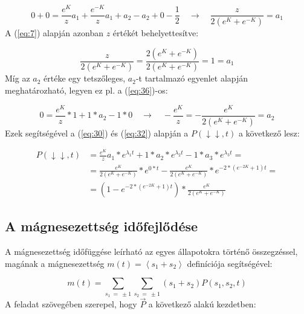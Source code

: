 \begin{equation} \label{eq:39}
    0 + 0
    =
    \frac{e^{K}}{z} a_{1} + \frac{e^{-K}}{z} a_{1} + a_{2} - a_{2} + 0 - \frac{1}{2}
    \quad \to \quad
    \frac{z}{2 \left( e^{K} + e^{-K} \right)}
    =
    a_{1}
\end{equation}
A (\ref{eq:7}) alapján azonban $z$ értékét behelyettesítve:

\begin{equation} \label{eq:40}
    \frac{z}{2 \left( e^{K} + e^{-K} \right)}
    =
    \frac{2 \left( e^{K} + e^{-K} \right)}{2 \left( e^{K} + e^{-K} \right)}
    =
    \boxed{
    1
    =
    a_{1}}
\end{equation}
Míg az $a_{2}$ értéke egy tetszőleges, $a_{2}$-t tartalmazó egyenlet alapján meghatározható, legyen ez pl. a (\ref{eq:36})-os:

\begin{equation} \label{eq:41}
    0
    =
    \frac{e^{K}}{z} * 1 + 1 * a_{2} - 1 * 0
    \quad \to \quad
    -\frac{e^{K}}{z}
    =
    \boxed{
    -\frac{e^{K}}{2 \left( e^{K} + e^{-K} \right)}
    =
    a_{2}}
\end{equation}
Ezek segítségével a (\ref{eq:30}) és (\ref{eq:32}) alapján a $P \left( \downarrow \downarrow, t \right)$ a következő lesz:

\begin{align} \label{eq:42}
    P \left( \downarrow \downarrow, t \right)
    &=
    \frac{e^{K}}{z} a_{1} * e^{\lambda_1 t} + 1 * a_{2} * e^{\lambda_2 t} - 1 * a_{3} * e^{\lambda_3 t}
    = \nonumber \\
    &=
    \frac{e^{K}}{2 \left( e^{K} + e^{-K} \right)} * e^{0 * t}
    -
    \frac{e^{K}}{2 \left( e^{K} + e^{-K} \right)} * e^{-2 * \left( e^{-2 K} + 1 \right) t}
    = \nonumber \\
    &=
    \boxed{
    \left( 1 - e^{-2 * \left( e^{-2 K} + 1 \right) t} \right) * \frac{e^{K}}{2 \left( e^{K} + e^{-K} \right)}
    }
\end{align}

\subsection{A mágnesezettség időfejlődése}
A mágnesezettség időfüggése leírható az egyes állapotokra történő összegzéssel, magának a mágnesezettség $m\left( t \right) = \left< s_{1} + s_{2} \right>$ definíciója segítségével:

\begin{equation} \label{eq:43}
    m \left( t \right)
    =
    \sum_{s_{1}\ =\ \pm 1} \sum_{s_{2}\ =\ \pm 1} \left( s_{1} + s_{2} \right)P(s_{1}, s_{2}, t)
\end{equation}
A feladat szövegében szerepel, hogy $\vec{P}$ a következő alakú kezdetben:

